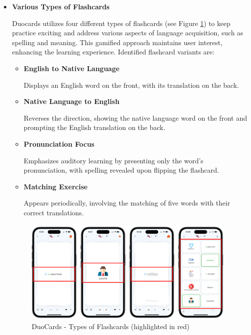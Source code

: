 \begin{itemize}
    \item \textbf{Various Types of Flashcards}

    Duocards utilizes four different types of flashcards (see Figure \ref{fig:duocards-flashcard-types}) to keep practice exciting and address various aspects of language acquisition, such as spelling and meaning. This gamified approach maintains user interest, enhancing the learning experience. Identified flashcard variants are:

    \begin{itemize} 
         \item \textbf{English to Native Language}
         
         Displays an English word on the front, with its translation on the back. 

         \item \textbf{Native Language to English}
         
         Reverses the direction, showing the native language word on the front and prompting the English translation on the back.
         
        \item \textbf{Pronunciation Focus}
        
        Emphasizes auditory learning by presenting only the word’s pronunciation, with spelling revealed upon flipping the flashcard. 
        
        \item \textbf{Matching Exercise}
        
        Appears periodically, involving the matching of five words with their correct translations. 
    
    \end{itemize}

    \begin{figure}[!h]
        \includegraphics[width=0.98\textwidth]{chapters/images/duocards-flashcard-types.png}
        \caption{DuoCards - Types of Flashcards (highlighted in red)}
        \label{fig:duocards-flashcard-types}
    \end{figure}
    

\end{itemize}
